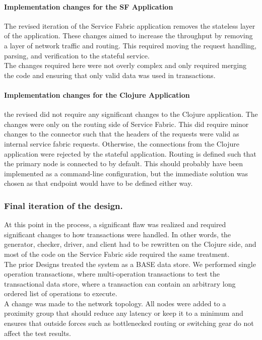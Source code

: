 \documentclass[a4paper,10pt,titlepage]{report}
\begin{document}
\paragraph*{Implementation changes for the SF Application}
The revised iteration of the Service Fabric application removes the stateless layer of the application. These changes aimed to increase the throughput by removing a layer of network traffic and routing. This required moving the request handling, parsing, and verification to the stateful service.   \\

The changes required here were not overly complex and only required merging the code and ensuring that only valid data was used in transactions. 
\\

\paragraph*{Implementation changes for the Clojure Application}
the revised did not require any significant changes to the Clojure application. The changes were only on the routing side of Service Fabric. This did require minor changes to the connector such that the headers of the requests were valid as internal service fabric requests. Otherwise, the connections from the Clojure application were rejected by the stateful application. Routing is defined such that the primary node is connected to by default. This should probably have been implemented as a command-line configuration, but the immediate solution was chosen as that endpoint would have to be defined either way. 


\subsubsection{Final iteration of the design.}
At this point in the process, a significant flaw was realized and required significant changes to how transactions were handled. In other words, the generator, checker, driver, and client had to be rewritten on the Clojure side, and most of the code on the Service Fabric side required the same treatment. 
\\
The prior Designs treated the system as a BASE data store. We performed single operation transactions, where multi-operation transactions to test the transactional data store, where a transaction can contain an arbitrary long ordered list of operations to execute. 
\\
A change was made to the network topology. All nodes were added to a proximity group that should reduce any latency or keep it to a minimum and ensures that outside forces such as bottlenecked routing or switching gear do not affect the test results.  \\
\end{document}
